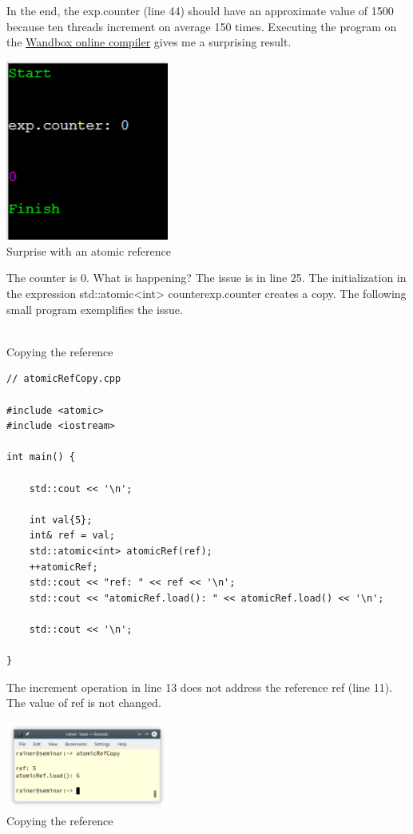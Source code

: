 In the end, the exp.counter (line 44) should have an approximate value of 1500 because ten threads increment on average 150 times. Executing the program on the \href{https://wandbox.org/}{Wandbox online compiler} gives me a surprising result.

\begin{center}
\includegraphics[width=0.4\textwidth]{content/3/chapter6/images/8.png}\\
Surprise with an atomic reference
\end{center}

The counter is 0. What is happening? The issue is in line 25. The initialization in the expression std::atomic<int> counter{exp.counter} creates a copy. The following small program exemplifies the issue.

\hspace*{\fill} \\ %
\noindent
Copying the reference
\begin{lstlisting}[style=styleCXX]
// atomicRefCopy.cpp

#include <atomic>
#include <iostream>

int main() {

	std::cout << '\n';
	
	int val{5};
	int& ref = val;
	std::atomic<int> atomicRef(ref);
	++atomicRef;
	std::cout << "ref: " << ref << '\n';
	std::cout << "atomicRef.load(): " << atomicRef.load() << '\n';
	
	std::cout << '\n';

}
\end{lstlisting}

The increment operation in line 13 does not address the reference ref (line 11). The value of ref is not changed.

\begin{center}
\includegraphics[width=0.4\textwidth]{content/3/chapter6/images/9.png}\\
Copying the reference
\end{center}

